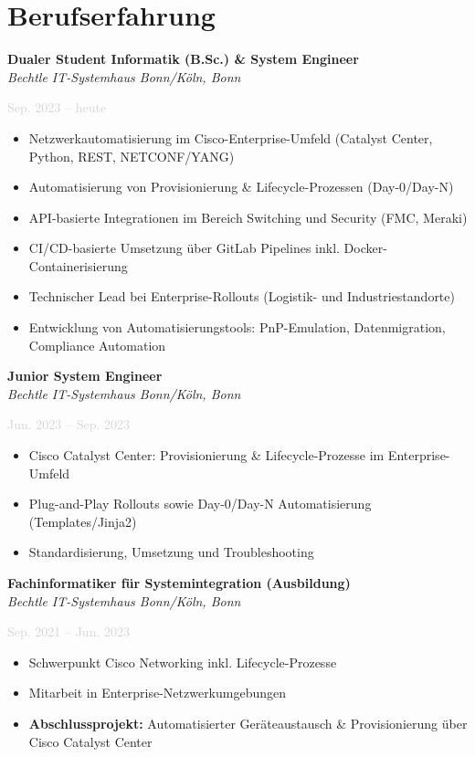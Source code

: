 \documentclass[11pt,a4paper]{article}
\newcommand{\cventry}[5]{
    \noindent
    \begin{minipage}[t]{0.75\textwidth}
        \textbf{#1}\\
        \textit{#2}
    \end{minipage}
    \hfill
    \begin{minipage}[t]{0.23\textwidth}
        \raggedleft\textcolor{lightgray}{#3}
    \end{minipage}
    \par\vspace{2pt}
    \noindent\textcolor{lightgray}{#4}
    \par\vspace{4pt}
    #5
    \par\vspace{8pt}
}
\begin{document}
\vspace{10pt}

\section*{Berufserfahrung}

\cventry{Dualer Student Informatik (B.Sc.) \& System Engineer}{Bechtle IT-Systemhaus Bonn/Köln, Bonn}{Sep. 2023 – heute}{}{
\begin{itemize}
    \item Netzwerkautomatisierung im Cisco-Enterprise-Umfeld (Catalyst Center, Python, REST, NETCONF/YANG)
    \item Automatisierung von Provisionierung \& Lifecycle-Prozessen (Day-0/Day-N)
    \item API-basierte Integrationen im Bereich Switching und Security (FMC, Meraki)
    \item CI/CD-basierte Umsetzung über GitLab Pipelines inkl. Docker-Containerisierung
    \item Technischer Lead bei Enterprise-Rollouts (Logistik- und Industriestandorte)
    \item Entwicklung von Automatisierungstools: PnP-Emulation, Datenmigration, Compliance Automation
\end{itemize}
}

\cventry{Junior System Engineer}{Bechtle IT-Systemhaus Bonn/Köln, Bonn}{Jun. 2023 – Sep. 2023}{}{
\begin{itemize}
    \item Cisco Catalyst Center: Provisionierung \& Lifecycle-Prozesse im Enterprise-Umfeld
    \item Plug-and-Play Rollouts sowie Day-0/Day-N Automatisierung (Templates/Jinja2)
    \item Standardisierung, Umsetzung und Troubleshooting
\end{itemize}
}

\cventry{Fachinformatiker für Systemintegration (Ausbildung)}{Bechtle IT-Systemhaus Bonn/Köln, Bonn}{Sep. 2021 – Jun. 2023}{}{
\begin{itemize}
    \item Schwerpunkt Cisco Networking inkl. Lifecycle-Prozesse
    \item Mitarbeit in Enterprise-Netzwerkumgebungen
    \item \textbf{Abschlussprojekt:} Automatisierter Geräteaustausch \& Provisionierung über Cisco Catalyst Center
\end{itemize}
}
\end{document}
